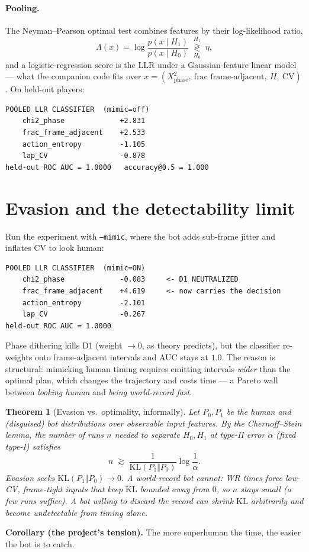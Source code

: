 \documentclass[11pt]{article}
\newtheorem{theorem}{Theorem}
\newcommand{\KL}{\mathrm{KL}}
\begin{document}
\paragraph{Pooling.} The Neyman--Pearson optimal test combines features by their
log-likelihood ratio,
\begin{equation}
\Lambda(x) = \log \frac{p(x\mid H_1)}{p(x\mid H_0)}
\;\overset{H_1}{\underset{H_0}{\gtrless}}\; \eta,
\label{eq:llr}
\end{equation}
and a logistic-regression score is the LLR under a Gaussian-feature linear model
--- what the companion code fits over
$x=(X^2_{\text{phase}},\ \text{frac frame-adjacent},\ H,\ \mathrm{CV})$. On
held-out players:
\begin{lstlisting}[style=out]
POOLED LLR CLASSIFIER  (mimic=off)
    chi2_phase             +2.831
    frac_frame_adjacent    +2.533
    action_entropy         -1.105
    lap_CV                 -0.878
held-out ROC AUC = 1.0000   accuracy@0.5 = 1.000
\end{lstlisting}

\section{Evasion and the detectability limit}
\label{sec:evasion}

Run the experiment with \texttt{--mimic}, where the bot adds sub-frame jitter and
inflates CV to look human:
\begin{lstlisting}[style=out]
POOLED LLR CLASSIFIER  (mimic=ON)
    chi2_phase             -0.083     <- D1 NEUTRALIZED
    frac_frame_adjacent    +4.619     <- now carries the decision
    action_entropy         -2.101
    lap_CV                 -0.267
held-out ROC AUC = 1.0000
\end{lstlisting}
Phase dithering kills D1 (weight $\to 0$, as theory predicts), but the classifier
re-weights onto frame-adjacent intervals and AUC stays at $1.0$. The reason is
structural: mimicking human timing requires emitting intervals \emph{wider} than
the optimal plan, which changes the trajectory and costs time --- a Pareto wall
between \emph{looking human} and \emph{being world-record fast}.

\begin{theorem}[Evasion vs.\ optimality, informally]
Let $P_0,P_1$ be the human and (disguised) bot distributions over observable
input features. By the Chernoff--Stein lemma, the number of runs $n$ needed to
separate $H_0,H_1$ at type-II error $\alpha$ (fixed type-I) satisfies
\begin{equation}
n \;\gtrsim\; \frac{1}{\KL(P_1\Vert P_0)} \log\frac{1}{\alpha}.
\end{equation}
Evasion seeks $\KL(P_1\Vert P_0)\to 0$. A \emph{world-record} bot cannot: WR
times force low-CV, frame-tight inputs that keep $\KL$ bounded away from $0$, so
$n$ stays small (a few runs suffice). A bot willing to discard the record can
shrink $\KL$ arbitrarily and become undetectable from timing alone.
\end{theorem}
\noindent\textbf{Corollary (the project's tension).} The more superhuman the
time, the easier the bot is to catch.
\end{document}
